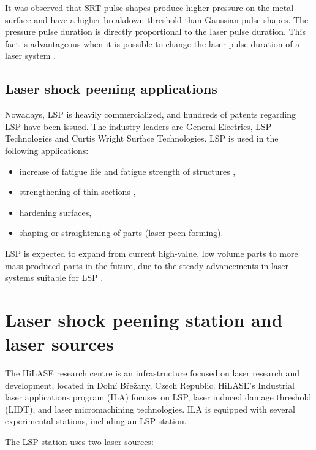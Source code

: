 It was observed that SRT pulse shapes produce higher pressure on the metal surface and have a higher breakdown threshold than Gaussian pulse shapes. The pressure pulse duration is directly proportional to the laser pulse duration.  This fact is advantageous when it is possible to change the laser pulse duration of a laser system \cite{devaux_fabbro_tollier_bartnicki_1993}. 


\subsection{Laser shock peening applications}

Nowadays, LSP is heavily commercialized, and hundreds of patents regarding LSP have been issued. The industry leaders are General Electrics, LSP Technologies and Curtis Wright Surface Technologies. LSP is used in the following applications:

\begin{itemize}
 
    \item increase of fatigue life and fatigue strength of structures \cite{dane_hackel_daly_harrisson_2000},
    \item strengthening of thin sections \cite{vaccari_1992},
    \item hardening surfaces,
    \item shaping or straightening of parts  (laser peen forming).

\end{itemize}

LSP is expected to expand from current high-value, low volume parts to more mass-produced parts in the future, due to the steady advancements in laser systems suitable for LSP \cite{clauer_2019}. 



\section{Laser shock peening station and laser sources}

The HiLASE research centre is an infrastructure focused on laser research and development, located in Dolní Břežany, Czech Republic. HiLASE's Industrial laser applications program (ILA) focuses on LSP, laser induced damage threshold (LIDT), and laser micromachining technologies. ILA is equipped with several experimental stations, including an LSP station. 

The LSP station uses two laser sources:

